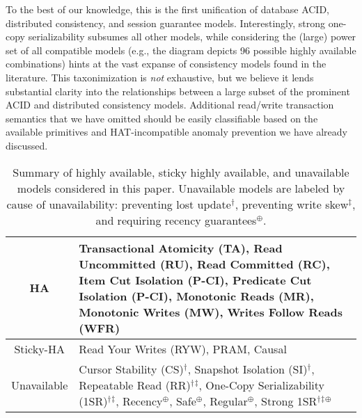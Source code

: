 To the best of our knowledge, this is the first unification of
database ACID, distributed consistency, and session guarantee
models. Interestingly, strong one-copy serializability subsumes all
other models, while considering the (large) power set of all
compatible models (e.g., the diagram depicts 96 possible highly
available combinations) hints at the vast expanse of consistency
models found in the literature. This taxonimization is \textit{not}
exhaustive, but we believe it lends substantial clarity into the
relationships between a large subset of the prominent ACID and
distributed consistency models. Additional read/write transaction
semantics that we have omitted should be easily classifiable based on
the available primitives and HAT-incompatible anomaly prevention we
have already discussed.

 \newcommand{\lostupdate}{$^\dagger$}
 \newcommand{\rwskew}{$^\ddagger$}
 \newcommand{\linearizable}{$^\oplus$}

\begin{table}[t!]
\begin{tabular}{| c | p{6cm} | }\hline
HA & Transactional Atomicity (TA), Read Uncommitted (RU), Read
Committed (RC), Item Cut Isolation (P-CI), Predicate Cut Isolation
(P-CI), Monotonic Reads (MR), Monotonic Writes (MW), Writes Follow
Reads (WFR)\\\hline Sticky-HA & Read Your Writes (RYW), PRAM,
Causal\\\hline Unavailable & Cursor Stability (CS)\lostupdate,
Snapshot Isolation (SI)\lostupdate, Repeatable Read
(RR)\lostupdate\rwskew, One-Copy Serializability
(1SR)\lostupdate\rwskew, Recency\linearizable, Safe\linearizable,
Regular\linearizable, Strong 1SR\lostupdate\rwskew\linearizable
\\\hline
\end{tabular}
\caption{Summary of highly available, sticky highly available, and
  unavailable models considered in this paper. Unavailable models are
  labeled by cause of unavailability: preventing lost
  update\lostupdate, preventing write skew\rwskew, and requiring
  recency guarantees\linearizable.}
\label{table:hatcompared}
\end{table}

